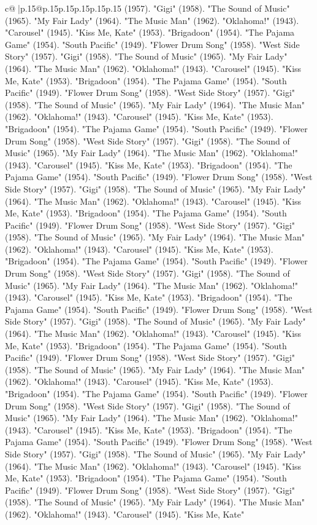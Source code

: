 \documentclass{article}
\begin{document}
{\begin{supertabular}{c@{$\;$}|p{.15\linewidth}@{}p{.15\linewidth}p{.15\linewidth}p{.15\linewidth}p{.15\linewidth}p{.15\linewidth}}
{{{(1957). "Gigi" (1958). "The Sound of Music" (1965). "My Fair Lady" (1964). "The Music Man" (1962). "Oklahoma!" (1943). "Carousel" (1945). "Kiss Me, Kate" (1953). "Brigadoon" (1954). "The Pajama Game" (1954). "South Pacific" (1949). "Flower Drum Song" (1958). "West Side Story" (1957). "Gigi" (1958). "The Sound of Music" (1965). "My Fair Lady" (1964). "The Music Man" (1962). "Oklahoma!" (1943). "Carousel" (1945). "Kiss Me, Kate" (1953). "Brigadoon" (1954). "The Pajama Game" (1954). "South Pacific" (1949). "Flower Drum Song" (1958). "West Side Story" (1957). "Gigi" (1958). "The Sound of Music" (1965). "My Fair Lady" (1964). "The Music Man" (1962). "Oklahoma!" (1943). "Carousel" (1945). "Kiss Me, Kate" (1953). "Brigadoon" (1954). "The Pajama Game" (1954). "South Pacific" (1949). "Flower Drum Song" (1958). "West Side Story" (1957). "Gigi" (1958). "The Sound of Music" (1965). "My Fair Lady" (1964). "The Music Man" (1962). "Oklahoma!" (1943). "Carousel" (1945). "Kiss Me, Kate" (1953). "Brigadoon" (1954). "The Pajama Game" (1954). "South Pacific" (1949). "Flower Drum Song" (1958). "West Side Story" (1957). "Gigi" (1958). "The Sound of Music" (1965). "My Fair Lady" (1964). "The Music Man" (1962). "Oklahoma!" (1943). "Carousel" (1945). "Kiss Me, Kate" (1953). "Brigadoon" (1954). "The Pajama Game" (1954). "South Pacific" (1949). "Flower Drum Song" (1958). "West Side Story" (1957). "Gigi" (1958). "The Sound of Music" (1965). "My Fair Lady" (1964). "The Music Man" (1962). "Oklahoma!" (1943). "Carousel" (1945). "Kiss Me, Kate" (1953). "Brigadoon" (1954). "The Pajama Game" (1954). "South Pacific" (1949). "Flower Drum Song" (1958). "West Side Story" (1957). "Gigi" (1958). "The Sound of Music" (1965). "My Fair Lady" (1964). "The Music Man" (1962). "Oklahoma!" (1943). "Carousel" (1945). "Kiss Me, Kate" (1953). "Brigadoon" (1954). "The Pajama Game" (1954). "South Pacific" (1949). "Flower Drum Song" (1958). "West Side Story" (1957). "Gigi" (1958). "The Sound of Music" (1965). "My Fair Lady" (1964). "The Music Man" (1962). "Oklahoma!" (1943). "Carousel" (1945). "Kiss Me, Kate" (1953). "Brigadoon" (1954). "The Pajama Game" (1954). "South Pacific" (1949). "Flower Drum Song" (1958). "West Side Story" (1957). "Gigi" (1958). "The Sound of Music" (1965). "My Fair Lady" (1964). "The Music Man" (1962). "Oklahoma!" (1943). "Carousel" (1945). "Kiss Me, Kate" (1953). "Brigadoon" (1954). "The Pajama Game" (1954). "South Pacific" (1949). "Flower Drum Song" (1958). "West Side Story" (1957). "Gigi" (1958). "The Sound of Music" (1965). "My Fair Lady" (1964). "The Music Man" (1962). "Oklahoma!" (1943). "Carousel" (1945). "Kiss Me, Kate" (1953). "Brigadoon" (1954). "The Pajama Game" (1954). "South Pacific" (1949). "Flower Drum Song" (1958). "West Side Story" (1957). "Gigi" (1958). "The Sound of Music" (1965). "My Fair Lady" (1964). "The Music Man" (1962). "Oklahoma!" (1943). "Carousel" (1945). "Kiss Me, Kate" (1953). "Brigadoon" (1954). "The Pajama Game" (1954). "South Pacific" (1949). "Flower Drum Song" (1958). "West Side Story" (1957). "Gigi" (1958). "The Sound of Music" (1965). "My Fair Lady" (1964). "The Music Man" (1962). "Oklahoma!" (1943). "Carousel" (1945). "Kiss Me, Kate" }}}
\end{supertabular}}
\end{document}
